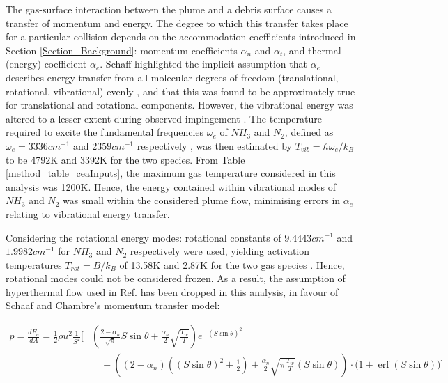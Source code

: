 \documentclass[journal]{new-aiaa}
\begin{document}
The gas-surface interaction between the plume and a debris surface causes a transfer of momentum and energy. The degree to which this transfer takes place for a particular collision depends on the accommodation coefficients introduced in Section \ref{Section_Background}: momentum coefficients $\alpha_n$ and $\alpha_t$, and thermal (energy) coefficient $\alpha_e$. Schaff highlighted the implicit assumption that $\alpha_e$ describes energy transfer from all molecular degrees of freedom (translational, rotational, vibrational) evenly \cite{chambreFlowRarefiedGases2017}, and that this was found to be approximately true for translational and rotational components. However, the vibrational energy was altered to a lesser extent during observed impingement \cite{euckenHandUndJahrbuch1950}. The temperature required to excite the fundamental frequencies $\omega_e$ of $NH_3$ and $N_2$, defined as $ \omega_e = 3336cm^{-1}$ and $ 2359cm^{-1}$ respectively \cite{irikuraExperimentalVibrationalZeroPoint2007,koopsMeasurementInterpretationAbsolute1983}, was then estimated by $T_{vib} = \hbar \omega_e / k_B$ to be 4792K and 3392K for the two species. From Table \ref{method_table_ceaInputs}, the maximum gas temperature considered in this analysis was 1200K. Hence, the energy contained within vibrational modes of $NH_3$ and $N_2$ was small within the considered plume flow, minimising errors in $\alpha_e$ relating to vibrational energy transfer.

Considering the rotational energy modes: rotational constants of  $9.4443 cm^{-1}$ and $1.9982 cm^{-1}$ for $NH_3$ and $N_2$ respectively were used, yielding activation temperatures $T_{rot} = B/ k_B$ of 13.58K and 2.87K for the two gas species \cite{huberConstantsDiatomicMolecules1979}. Hence, rotational modes could not be considered frozen. As a result, the assumption of hyperthermal flow used in Ref. \cite{petersCOBRAContactlessDetumbling2016} has been dropped in this analysis, in favour of Schaaf and Chambre's momentum transfer model:

\begin{equation}
    \begin{aligned}
    p = \frac{dF_n}{dA} = \frac{1}{2} \rho u^2 \frac{1}{S^2} \Bigg[ &
    \left( \frac{2 - \alpha_n}{\sqrt{\pi}}  S \sin{\theta} + \frac{\alpha_n}{2} \sqrt{\frac{T_w}{T}} \right) 
    e^{- (S \sin{\theta})^2} \\
    &\quad + \left(  (2 - \alpha_n)\left( (S \sin{\theta})^2 + \frac{1}{2} \right) + 
    \frac{\alpha_n}{2} \sqrt{\pi \frac{T_w}{T}} (S\sin{\theta}) \right)
    \cdot \Big( 1 + \operatorname{erf} (S\sin{\theta}) \Big)   
    \Bigg]
    \end{aligned}
    \label{eq_method_Fn_differential}
\end{equation}
\end{document}
